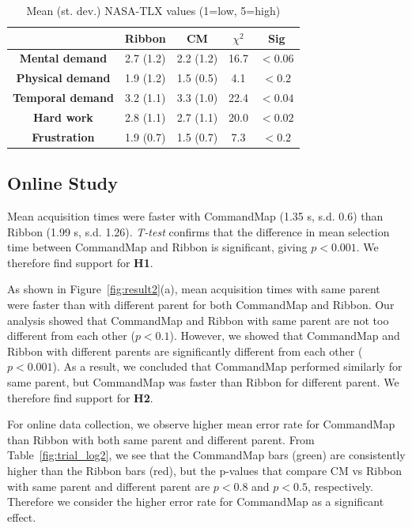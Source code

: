 \documentclass{article}
\begin{document}
 \begin{table}[tbh]
  \centering
\begin{tabular}{c|c|c|c|c}
  &  \textbf{Ribbon}  &  \textbf{CM} &  \textbf{$\chi^2$} & \textbf{Sig}          \\\hline
 \textbf{Mental demand}&   2.7 (1.2)  & 2.2 (1.2)  & 16.7  & $<0.06$   \\ \hline
 \rowcolor{lightgray}
\textbf{Physical demand}  &    1.9 (1.2) &   1.5 (0.5) & 4.1  & $<0.2$  \\\hline       
\textbf{Temporal demand}  &    3.2 (1.1) &   3.3 (1.0) & 22.4  & $<0.04$  \\\hline      
 \rowcolor{lightgray}
\textbf{Hard work}  &    2.8 (1.1) &   2.7 (1.1) & 20.0  & $<0.02$   \\\hline   
\textbf{Frustration}  &    1.9 (0.7) &   1.5 (0.7) & 7.3  & $<0.2$ \\ \hline \hline
\end{tabular}
\caption{Mean (st. dev.) NASA-TLX values (1=low, 5=high)}
\label{fig:trial_log}
\end{table}




\subsection*{Online Study}
Mean acquisition times were faster with CommandMap (1.35 s, s.d. 0.6) than Ribbon (1.99 s, s.d. 1.26). \textit{T-test} confirms that the difference in mean selection time between CommandMap and Ribbon is significant, giving $p<0.001$. We therefore find support for \textbf{H1}.

As shown in Figure~\ref{fig:result2}(a), mean acquisition times with same parent were faster than with different parent for both CommandMap and Ribbon. Our analysis showed that CommandMap and Ribbon with same parent are not too different from each other ($p<0.1$). However, we showed that CommandMap and Ribbon with different parents are significantly different from each other ($p<0.001$). As a result, we concluded that CommandMap performed similarly for same parent, but CommandMap was faster than Ribbon for different parent. We therefore find support for \textbf{H2}. 

For online data collection, we observe higher mean error rate for CommandMap than Ribbon with both same parent and different parent. From Table~\ref{fig:trial_log2}, we see that the CommandMap bars (green) are consistently higher than the Ribbon bars (red), but the p-values that compare CM vs Ribbon with same parent and different parent are $p<0.8$ and $p<0.5$, respectively. Therefore we consider the higher error rate for CommandMap as a significant effect. 
\end{document}
